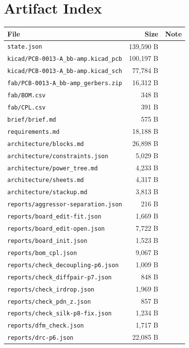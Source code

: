 \documentclass[11pt,a4paper]{article}
\begin{document}
\section{Artifact Index}
{\small
\begin{longtable}{p{9cm}rp{4cm}}
\toprule
\textbf{File} & \textbf{Size} & \textbf{Note} \\
\midrule
\endhead
\texttt{state.json} & 139,590 B &  \\
\texttt{kicad/PCB-0013-A\_bb-amp.kicad\_pcb} & 100,197 B &  \\
\texttt{kicad/PCB-0013-A\_bb-amp.kicad\_sch} & 77,784 B &  \\
\texttt{fab/PCB-0013-A\_bb-amp\_gerbers.zip} & 16,312 B &  \\
\texttt{fab/BOM.csv} & 348 B &  \\
\texttt{fab/CPL.csv} & 391 B &  \\
\texttt{brief/brief.md} & 575 B &  \\
\texttt{requirements.md} & 18,188 B &  \\
\texttt{architecture/blocks.md} & 26,898 B &  \\
\texttt{architecture/constraints.json} & 5,029 B &  \\
\texttt{architecture/power\_tree.md} & 4,233 B &  \\
\texttt{architecture/sheets.md} & 4,317 B &  \\
\texttt{architecture/stackup.md} & 3,813 B &  \\
\texttt{reports/aggressor-separation.json} & 216 B &  \\
\texttt{reports/board\_edit-fit.json} & 1,669 B &  \\
\texttt{reports/board\_edit-open.json} & 7,722 B &  \\
\texttt{reports/board\_init.json} & 1,523 B &  \\
\texttt{reports/bom\_cpl.json} & 9,067 B &  \\
\texttt{reports/check\_decoupling-p6.json} & 1,009 B &  \\
\texttt{reports/check\_diffpair-p7.json} & 848 B &  \\
\texttt{reports/check\_irdrop.json} & 1,969 B &  \\
\texttt{reports/check\_pdn\_z.json} & 857 B &  \\
\texttt{reports/check\_silk-p8-fix.json} & 1,234 B &  \\
\texttt{reports/dfm\_check.json} & 1,717 B &  \\
\texttt{reports/drc-p6.json} & 22,085 B &  \\

\end{longtable}}
\end{document}
